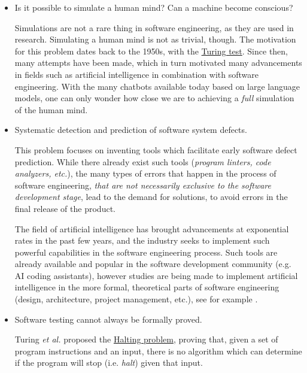 \documentclass[a4paper]{article}
\begin{document}
            \begin{itemize}
                \item Is it possible to simulate a human mind? Can a machine become conscious?
                
                Simulations are not a rare thing in software engineering, as they are used in research. Simulating a human mind is not as trivial, though. The motivation for this problem dates back to the 1950s, with the \href{https://en.wikipedia.org/wiki/Turing_test}{Turing test}.
                Since then, many attempts have been made, which in turn motivated many advancements in fields such as artificial intelligence in combination with software engineering. With the many chatbots available today based on large language models, one can only wonder how close we are to achieving a \emph{full} simulation of the human mind.
                
                \item Systematic detection and prediction of software system defects.
                
                This problem focuses on inventing tools which facilitate early software defect prediction. While there already exist such tools (\emph{program linters, code analyzers, etc.}), the many types of errors that happen in the process of software engineering, \emph{that are not necessarily exclusive to the software development stage}, lead to the demand for solutions, to avoid errors in the final release of the product.

                The field of artificial intelligence has brought advancements at exponential rates in the past few years, and the industry seeks to implement such powerful capabilities in the software engineering process. Such tools are already available and popular in the software development community (e.g. AI coding assistants), however studies are being made to implement artificial intelligence in the more formal, theoretical parts of software engineering (design, architecture, project management, etc.), see for example \cite{PACHOULY2022104773}.
                
                \item Software testing cannot always be formally proved\supercite{linkedinTestingUnsolvedProblem}.
                
                Turing \emph{et al.} proposed the \href{https://en.wikipedia.org/wiki/Halting_problem#:~:text=In%20computability%20theory%2C%20the%20halting,or%20continue%20to%20run%20forever.}{Halting problem}, proving that, given a set of program instructions and an input, there is no algorithm which can determine if the program will stop (i.e. \emph{halt}) given that input.


\end{itemize}
\end{document}
